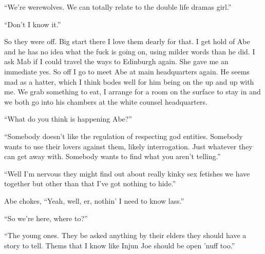 ``We're werewolves. We can totally relate to the double life dramas girl.''

``Don't I know it.''

So they were off. Big start there I love them dearly for that. I get hold of Abe and he has no idea what the fuck is going on, using milder words than he did. I ask Mab if I could travel the ways to Edinburgh again. She gave me an immediate yes. So off I go to meet Abe at main headquarters again. He seems mad as a hatter, which I think bodes well for him being on the up and up with me. We grab something to eat, I arrange for a room on the surface to stay in and we both go into his chambers at the white counsel headquarters.

``What do you think is happening Abe?''

``Somebody doesn't like the regulation of respecting god entities. Somebody wants to use their lovers against them, likely interrogation. Just whatever they can get away with. Somebody wants to find what you aren't telling.''

``Well I'm nervous they might find out about really kinky sex fetishes we have together but other than that I've got nothing to hide.''

Abe chokes, ``Yeah, well, er, nothin' I need to know lass.''

``So we're here, where to?''

``The young ones. They be asked anything by their elders they should have a story to tell. Thems that I know like Injun Joe should be open 'nuff too.''

